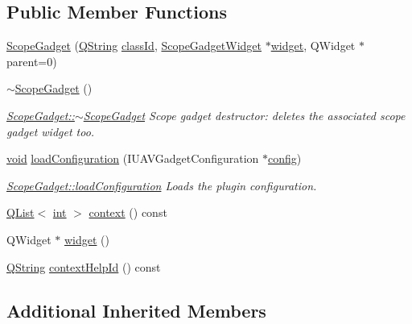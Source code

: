 \subsection*{Public Member Functions}
\begin{DoxyCompactItemize}
\item 
\hyperlink{group___scope_plugin_ga3f75e488a9369b654162e789b9f7d4c8}{Scope\-Gadget} (\hyperlink{group___u_a_v_objects_plugin_gab9d252f49c333c94a72f97ce3105a32d}{Q\-String} \hyperlink{group___core_plugin_ga3878fde66a57220608960bcc3fbeef2c}{class\-Id}, \hyperlink{class_scope_gadget_widget}{Scope\-Gadget\-Widget} $\ast$\hyperlink{group___scope_plugin_ga64f4c7f063a7d85c79728a770d411cb2}{widget}, Q\-Widget $\ast$parent=0)
\item 
\hyperlink{group___scope_plugin_ga814c8fd9020778e2cb89a7ab8a49995b}{$\sim$\-Scope\-Gadget} ()
\begin{DoxyCompactList}\small\item\em \hyperlink{group___scope_plugin_ga814c8fd9020778e2cb89a7ab8a49995b}{Scope\-Gadget\-::$\sim$\-Scope\-Gadget} Scope gadget destructor\-: deletes the associated scope gadget widget too. \end{DoxyCompactList}\item 
\hyperlink{group___u_a_v_objects_plugin_ga444cf2ff3f0ecbe028adce838d373f5c}{void} \hyperlink{group___scope_plugin_ga34947ab35d8b4d37de1a1d70e32e2de5}{load\-Configuration} (I\-U\-A\-V\-Gadget\-Configuration $\ast$\hyperlink{deflate_8c_a4473b5227787415097004fd39f55185e}{config})
\begin{DoxyCompactList}\small\item\em \hyperlink{group___scope_plugin_ga34947ab35d8b4d37de1a1d70e32e2de5}{Scope\-Gadget\-::load\-Configuration} Loads the plugin configuration. \end{DoxyCompactList}\item 
\hyperlink{class_q_list}{Q\-List}$<$ \hyperlink{ioapi_8h_a787fa3cf048117ba7123753c1e74fcd6}{int} $>$ \hyperlink{group___scope_plugin_gad13cd805d94869e729a8eb14728e2551}{context} () const 
\item 
Q\-Widget $\ast$ \hyperlink{group___scope_plugin_ga64f4c7f063a7d85c79728a770d411cb2}{widget} ()
\item 
\hyperlink{group___u_a_v_objects_plugin_gab9d252f49c333c94a72f97ce3105a32d}{Q\-String} \hyperlink{group___scope_plugin_gad4bf2378223ce3ef188714a3ce9d9fb3}{context\-Help\-Id} () const 
\end{DoxyCompactItemize}
\subsection*{Additional Inherited Members}


